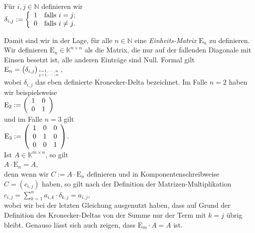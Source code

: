 \begin{Definition}
  F\"{u}r $i,j \in \mathbb{N}$ definieren wir
  \\[0.2cm]
  \hspace*{1.3cm}
  $\delta_{i,j} := \left\{
                  \begin{array}[c]{ll}
                    1 & \mbox{falls $i = j$;} \\
                    0 & \mbox{falls $i \not= j$}.
                  \end{array}
                  \right.
  $
\eoxs
\end{Definition}
Damit sind wir in der Lage, f\"{u}r alle $n \in \mathbb{N}$ eine {\emph{\color{blue}Einheits-Matrix}} $\mathrm{E}_n$ zu
definieren.  Wir definieren $\mathrm{E}_n \in \mathbb{K}^{n \times n}$ als die Matrix, die nur auf der
fallenden Diagonale mit Einsen besetzt ist, alle anderen Eintr\"{a}ge sind Null.  Formal
gilt
\\[0.2cm]
\hspace*{1.3cm}
$\mathrm{E}_n = \bigl(\delta_{i,j}\bigr)_{i=1,\cdots,n \atop j=1,\cdots,n}$,
\\[0.2cm]
wobei $\delta_{i,j}$ das eben definierte Kronecker-Delta bezeichnet.  
Im Falle $n = 2$ haben wir beispielsweise
\\[0.2cm]
\hspace*{1.3cm}
$\mathrm{E}_2 := \left(
  \begin{array}[c]{ll}
    1 & 0 \\
    0 & 1 \\
  \end{array}
  \right)
$
\\[0.2cm]
und im Falle $n = 3$ gilt
\\[0.2cm]
\hspace*{1.3cm}
$\mathrm{E}_3 := \left(
  \begin{array}[c]{lll}
    1 & 0 & 0 \\
    0 & 1 & 0 \\
    0 & 0 & 1 \\
  \end{array}
  \right)
$.
\\[0.2cm]
Ist $A \in \mathbb{K}^{m \times n}$,
so gilt
\\[0.2cm]
\hspace*{1.3cm}
$A \cdot \mathrm{E}_n = A$,
\\[0.2cm]
denn wenn wir $C := A \cdot \mathrm{E}_n$ definieren und in Komponentenschreibweise $C = (c_{i,j})$ haben, so
gilt nach der Definition der Matrizen-Multiplikation
\\[0.2cm]
\hspace*{1.3cm}
$c_{i,j} = \sum\limits_{k=1}^n a_{i,k} \cdot \delta_{k,j} = a_{i,j}$,
\\[0.2cm]
wobei wir bei der letzten Gleichung ausgenutzt haben, dass auf Grund der Definition des
Kronecker-Deltas von der Summe nur der Term mit $k = j$ \"{u}brig bleibt.  Genauso l\"{a}sst sich auch
zeigen, dass $\mathrm{E}_m \cdot A = A$ ist.

